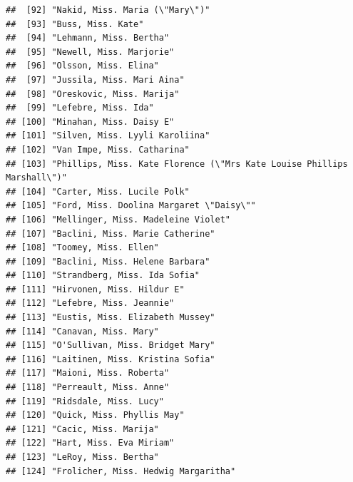 \documentclass[11pt,]{book}
\begin{document}
\begin{verbatim}
##  [92] "Nakid, Miss. Maria (\"Mary\")"                                        
##  [93] "Buss, Miss. Kate"                                                     
##  [94] "Lehmann, Miss. Bertha"                                                
##  [95] "Newell, Miss. Marjorie"                                               
##  [96] "Olsson, Miss. Elina"                                                  
##  [97] "Jussila, Miss. Mari Aina"                                             
##  [98] "Oreskovic, Miss. Marija"                                              
##  [99] "Lefebre, Miss. Ida"                                                   
## [100] "Minahan, Miss. Daisy E"                                               
## [101] "Silven, Miss. Lyyli Karoliina"                                        
## [102] "Van Impe, Miss. Catharina"                                            
## [103] "Phillips, Miss. Kate Florence (\"Mrs Kate Louise Phillips Marshall\")"
## [104] "Carter, Miss. Lucile Polk"                                            
## [105] "Ford, Miss. Doolina Margaret \"Daisy\""                               
## [106] "Mellinger, Miss. Madeleine Violet"                                    
## [107] "Baclini, Miss. Marie Catherine"                                       
## [108] "Toomey, Miss. Ellen"                                                  
## [109] "Baclini, Miss. Helene Barbara"                                        
## [110] "Strandberg, Miss. Ida Sofia"                                          
## [111] "Hirvonen, Miss. Hildur E"                                             
## [112] "Lefebre, Miss. Jeannie"                                               
## [113] "Eustis, Miss. Elizabeth Mussey"                                       
## [114] "Canavan, Miss. Mary"                                                  
## [115] "O'Sullivan, Miss. Bridget Mary"                                       
## [116] "Laitinen, Miss. Kristina Sofia"                                       
## [117] "Maioni, Miss. Roberta"                                                
## [118] "Perreault, Miss. Anne"                                                
## [119] "Ridsdale, Miss. Lucy"                                                 
## [120] "Quick, Miss. Phyllis May"                                             
## [121] "Cacic, Miss. Marija"                                                  
## [122] "Hart, Miss. Eva Miriam"                                               
## [123] "LeRoy, Miss. Bertha"                                                  
## [124] "Frolicher, Miss. Hedwig Margaritha"                                   

\end{verbatim}
\end{document}
